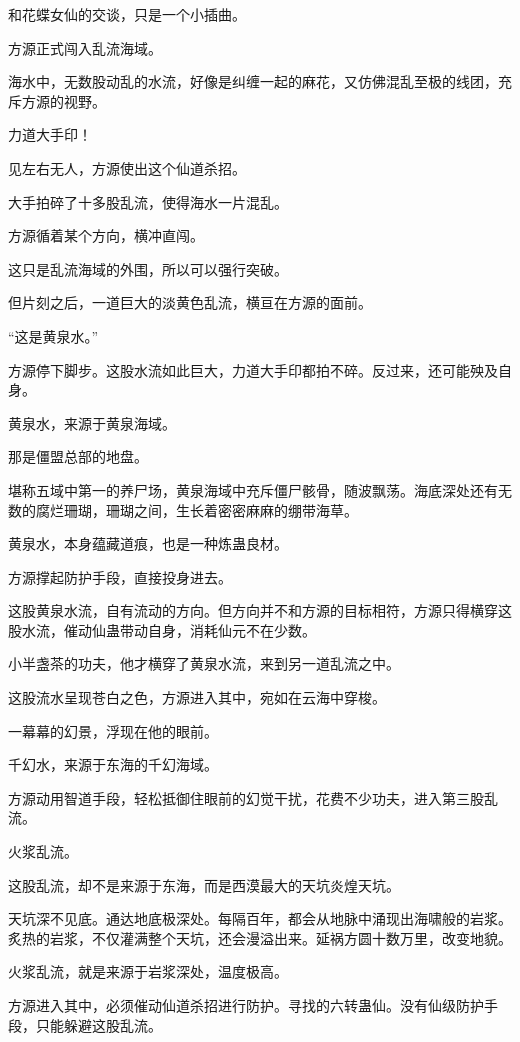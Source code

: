 
\begin{this_body}

和花蝶女仙的交谈，只是一个小插曲。

方源正式闯入乱流海域。

海水中，无数股动乱的水流，好像是纠缠一起的麻花，又仿佛混乱至极的线团，充斥方源的视野。

力道大手印！

见左右无人，方源使出这个仙道杀招。

大手拍碎了十多股乱流，使得海水一片混乱。

方源循着某个方向，横冲直闯。

这只是乱流海域的外围，所以可以强行突破。

但片刻之后，一道巨大的淡黄色乱流，横亘在方源的面前。

“这是黄泉水。”

方源停下脚步。这股水流如此巨大，力道大手印都拍不碎。反过来，还可能殃及自身。

黄泉水，来源于黄泉海域。

那是僵盟总部的地盘。

堪称五域中第一的养尸场，黄泉海域中充斥僵尸骸骨，随波飘荡。海底深处还有无数的腐烂珊瑚，珊瑚之间，生长着密密麻麻的绷带海草。

黄泉水，本身蕴藏道痕，也是一种炼蛊良材。

方源撑起防护手段，直接投身进去。

这股黄泉水流，自有流动的方向。但方向并不和方源的目标相符，方源只得横穿这股水流，催动仙蛊带动自身，消耗仙元不在少数。

小半盏茶的功夫，他才横穿了黄泉水流，来到另一道乱流之中。

这股流水呈现苍白之色，方源进入其中，宛如在云海中穿梭。

一幕幕的幻景，浮现在他的眼前。

千幻水，来源于东海的千幻海域。

方源动用智道手段，轻松抵御住眼前的幻觉干扰，花费不少功夫，进入第三股乱流。

火浆乱流。

这股乱流，却不是来源于东海，而是西漠最大的天坑炎煌天坑。

天坑深不见底。通达地底极深处。每隔百年，都会从地脉中涌现出海啸般的岩浆。炙热的岩浆，不仅灌满整个天坑，还会漫溢出来。延祸方圆十数万里，改变地貌。

火浆乱流，就是来源于岩浆深处，温度极高。

方源进入其中，必须催动仙道杀招进行防护。寻找的六转蛊仙。没有仙级防护手段，只能躲避这股乱流。


\end{this_body}
